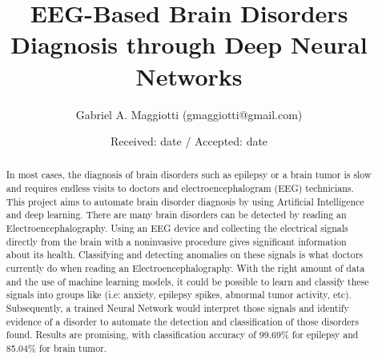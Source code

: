\documentclass{llncs}       %
\begin{document}
\title{EEG-Based Brain Disorders Diagnosis through Deep Neural Networks%
}


\author{Gabriel A. Maggiotti (gmaggiotti@gmail.com)
}



\date{Received: date / Accepted: date}


\maketitle


\begin{abstract}
In most cases, the diagnosis of brain disorders such as epilepsy or a brain tumor is slow and requires endless visits to doctors and electroencephalogram (EEG) technicians. This project aims to automate brain disorder diagnosis by using Artificial Intelligence and deep learning. There are many brain disorders  can be detected by reading an Electroencephalography. Using an EEG device and collecting the electrical signals directly from the brain with a noninvasive procedure gives significant information about its health. Classifying and detecting anomalies on these signals is what doctors currently do when reading an Electroencephalography. With the right amount of data and the use of machine learning models, it could be possible to learn and classify these signals into groups like (i.e: anxiety, epilepsy spikes, abnormal tumor activity, etc). Subsequently, a trained Neural Network would interpret those signals and identify evidence of a disorder to automate the detection and classification of those disorders found. Results are promising, with classification accuracy of 99.69\% for epilepsy and 85.04\% for brain tumor.

\end{abstract}


\paragraph{}\paragraph{}
\end{document}
